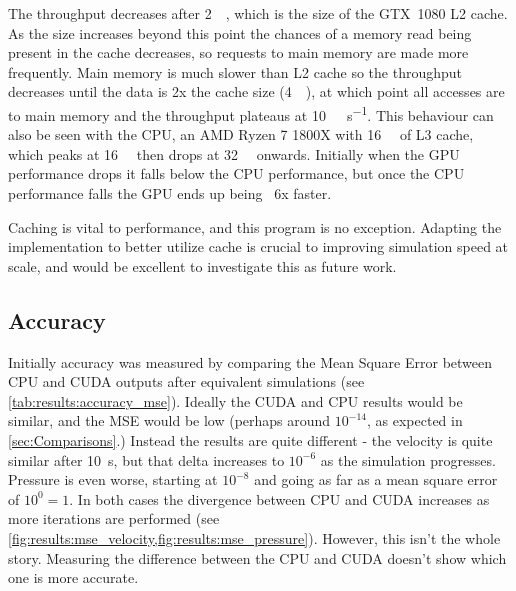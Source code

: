 The throughput decreases after \SI{2}{\mega\byte}, which is the size of the GTX~1080 L2 cache\cite{nvidia1080Whitepaper}.
As the size increases beyond this point the chances of a memory read being present in the cache decreases, so requests to main memory are made more frequently.
Main memory is much slower than L2 cache so the throughput decreases until the data is 2x the cache size (\SI{4}{\mega\byte}), at which point all accesses are to main memory and the throughput plateaus at \SI{10}{\giga\op\per\second}.
This behaviour can also be seen with the CPU, an AMD Ryzen 7 1800X with \SI{16}{\mega\byte} of L3 cache, which peaks at \SI{16}{\mega\byte} then drops at \SI{32}{\mega\byte} onwards.
Initially when the GPU performance drops it falls below the CPU performance, but once the CPU performance falls the GPU ends up being ~6x faster.

Caching is vital to performance, and this program is no exception.
Adapting the implementation to better utilize cache is crucial to improving simulation speed at scale, and would be excellent to investigate this as future work.

\subsection{Accuracy}\label{sec:Results:Sim:Accuracy}



Initially accuracy was measured by comparing the Mean Square Error between CPU and CUDA outputs after equivalent simulations (see \cref{tab:results:accuracy_mse}).
Ideally the CUDA and CPU results would be similar, and the MSE would be low (perhaps around $10^{-14}$, as expected in \cref{sec:Comparisons}.)
Instead the results are quite different - the velocity is quite similar after \SI{10}{\second}, but that delta increases to $10^{-6}$ as the simulation progresses.
Pressure is even worse, starting at $10^{-8}$ and going as far as a mean square error of $10^{0} = 1$.
In both cases the divergence between CPU and CUDA increases as more iterations are performed (see \cref{fig:results:mse_velocity,fig:results:mse_pressure}).
However, this isn't the whole story.
Measuring the difference between the CPU and CUDA doesn't show which one is more accurate.


